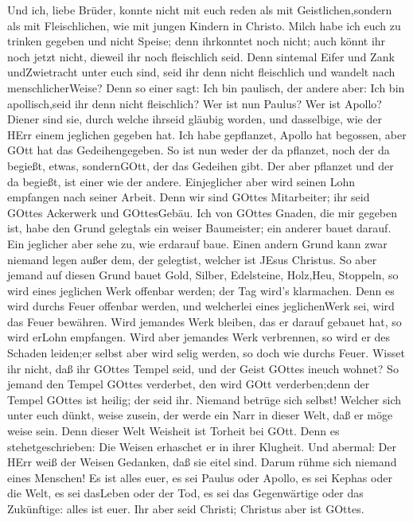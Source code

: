  Und ich, liebe Brüder, konnte nicht mit euch reden als mit
Geistlichen,sondern als mit Fleischlichen, wie mit jungen Kindern in
Christo.  Milch habe ich euch zu trinken gegeben und nicht
Speise; denn ihrkonntet noch nicht; auch könnt ihr noch jetzt nicht,
 dieweil ihr noch fleischlich seid. Denn sintemal Eifer und
Zank undZwietracht unter euch sind, seid ihr denn nicht fleischlich und
wandelt nach menschlicherWeise?  Denn so einer sagt: Ich bin
paulisch, der andere aber: Ich bin apollisch,seid ihr denn nicht
fleischlich?  Wer ist nun Paulus? Wer ist Apollo? Diener
sind sie, durch welche ihrseid gläubig worden, und dasselbige, wie der
HErr einem jeglichen gegeben hat.  Ich habe gepflanzet,
Apollo hat begossen, aber GOtt hat das Gedeihengegeben.  So
ist nun weder der da pflanzet, noch der da begießt, etwas, sondernGOtt,
der das Gedeihen gibt.  Der aber pflanzet und der da
begießt, ist einer wie der andere. Einjeglicher aber wird seinen Lohn
empfangen nach seiner Arbeit.  Denn wir sind GOttes
Mitarbeiter; ihr seid GOttes Ackerwerk und GOttesGebäu. 
Ich von GOttes Gnaden, die mir gegeben ist, habe den Grund gelegtals ein
weiser Baumeister; ein anderer bauet darauf. Ein jeglicher aber sehe zu,
wie erdarauf baue.  Einen andern Grund kann zwar niemand
legen außer dem, der gelegtist, welcher ist JEsus Christus.
 So aber jemand auf diesen Grund bauet Gold, Silber,
Edelsteine, Holz,Heu, Stoppeln,  so wird eines jeglichen
Werk offenbar werden; der Tag wird's klarmachen. Denn es wird durchs
Feuer offenbar werden, und welcherlei eines jeglichenWerk sei, wird das
Feuer bewähren.  Wird jemandes Werk bleiben, das er darauf
gebauet hat, so wird erLohn empfangen.  Wird aber jemandes
Werk verbrennen, so wird er des Schaden leiden;er selbst aber wird selig
werden, so doch wie durchs Feuer.  Wisset ihr nicht, daß
ihr GOttes Tempel seid, und der Geist GOttes ineuch wohnet?
 So jemand den Tempel GOttes verderbet, den wird GOtt
verderben;denn der Tempel GOttes ist heilig; der seid ihr. 
Niemand betrüge sich selbst! Welcher sich unter euch dünkt, weise
zusein, der werde ein Narr in dieser Welt, daß er möge weise sein.
 Denn dieser Welt Weisheit ist Torheit bei GOtt. Denn es
stehetgeschrieben: Die Weisen erhaschet er in ihrer Klugheit.
 Und abermal: Der HErr weiß der Weisen Gedanken, daß sie
eitel sind.  Darum rühme sich niemand eines Menschen! Es
ist alles euer,  es sei Paulus oder Apollo, es sei Kephas
oder die Welt, es sei dasLeben oder der Tod, es sei das Gegenwärtige
oder das Zukünftige: alles ist euer.  Ihr aber seid
Christi; Christus aber ist GOttes.

